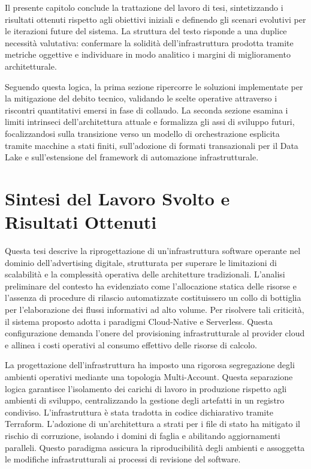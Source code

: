 Il presente capitolo conclude la trattazione del lavoro di tesi, sintetizzando i risultati ottenuti rispetto agli obiettivi iniziali e definendo gli scenari evolutivi per le iterazioni future del sistema. La struttura del testo risponde a una duplice necessità valutativa: confermare la solidità dell'infrastruttura prodotta tramite metriche oggettive e individuare in modo analitico i margini di miglioramento architetturale.

Seguendo questa logica, la prima sezione ripercorre le soluzioni implementate per la mitigazione del debito tecnico, validando le scelte operative attraverso i riscontri quantitativi emersi in fase di collaudo. La seconda sezione esamina i limiti intrinseci dell'architettura attuale e formalizza gli assi di sviluppo futuri, focalizzandosi sulla transizione verso un modello di orchestrazione esplicita tramite macchine a stati finiti, sull'adozione di formati transazionali per il Data Lake e sull'estensione del framework di automazione infrastrutturale.

\section{Sintesi del Lavoro Svolto e Risultati Ottenuti}
Questa tesi descrive la riprogettazione di un'infrastruttura software operante nel dominio dell'advertising digitale, strutturata per superare le limitazioni di scalabilità e la complessità operativa delle architetture tradizionali. L'analisi preliminare del contesto ha evidenziato come l'allocazione statica delle risorse e l'assenza di procedure di rilascio automatizzate costituissero un collo di bottiglia per l'elaborazione dei flussi informativi ad alto volume. Per risolvere tali criticità, il sistema proposto adotta i paradigmi Cloud-Native e Serverless. Questa configurazione demanda l'onere del provisioning infrastrutturale al provider cloud e allinea i costi operativi al consumo effettivo delle risorse di calcolo.

La progettazione dell'infrastruttura ha imposto una rigorosa segregazione degli ambienti operativi mediante una topologia Multi-Account. Questa separazione logica garantisce l'isolamento dei carichi di lavoro in produzione rispetto agli ambienti di sviluppo, centralizzando la gestione degli artefatti in un registro condiviso. L'infrastruttura è stata tradotta in codice dichiarativo tramite Terraform. L'adozione di un'architettura a strati per i file di stato ha mitigato il rischio di corruzione, isolando i domini di faglia e abilitando aggiornamenti paralleli. Questo paradigma assicura la riproducibilità degli ambienti e assoggetta le modifiche infrastrutturali ai processi di revisione del software.

